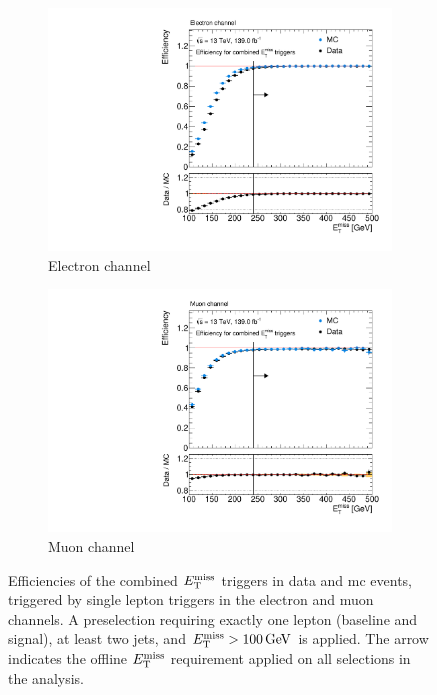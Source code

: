 \begin{figure}
	\centering
	\begin{subfigure}[b]{0.49\linewidth}
		\centering\includegraphics[width=\textwidth]{trigger/met_ele}
		\caption{Electron channel\label{fig:trigger_met_ele}}
	\end{subfigure}\hfill
	\begin{subfigure}[b]{0.49\linewidth}
		\centering\includegraphics[width=\textwidth]{trigger/met_mu}
		\caption{Muon channel\label{fig:trigger_met_mu}}
	\end{subfigure}
		\caption{Efficiencies of the combined $E_{\textrm{T}}^{\textrm{miss}}$ triggers in data and \gls{mc} events, triggered by single lepton triggers in the   electron and  muon channels. A preselection requiring exactly one lepton (baseline and signal), at least two jets, and $\etmiss > \SI{100}{\GeV}$ is applied. The arrow indicates the offline $E_{\textrm{T}}^{\textrm{miss}}$ requirement applied on all selections in the analysis.}\label{fig:trigger_eff}
\end{figure}


